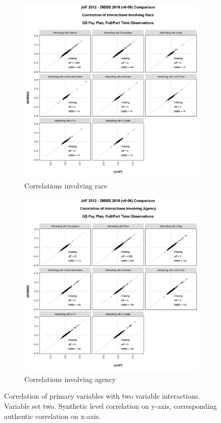 \documentclass[10pt, letterpaper]{article}
\begin{document}
\begin{spacing}{1.0}
\begin{figure}[h]
    \centering
    \begin{subfigure}{1\textwidth}
        \centering
        \includegraphics[width=4.5in, trim={0 0.2in 0 1in}, clip]{JdFDIBBSCorrelationInteraction-Race.png}
        \caption{Correlations involving race}
        \vspace{12pt}
    \end{subfigure}
    \begin{subfigure}{1\textwidth}
        \centering
        \includegraphics[width=4.5in, trim={0 0.2in 0 1in}, clip]{JdFDIBBSCorrelationInteraction-Agency.png}
        \caption{Correlations involving agency}
        \vspace{12pt}
    \end{subfigure}
    \caption{Correlation of primary variables with two variable interactions.  Variable set two.  Synthetic level correlation on y-axis, corresponding authentic correlation on x-axis.}
    \label{figure:JdFDIBBSCorrelationInteraction2}
\end{figure}


\end{spacing}
\end{document}
